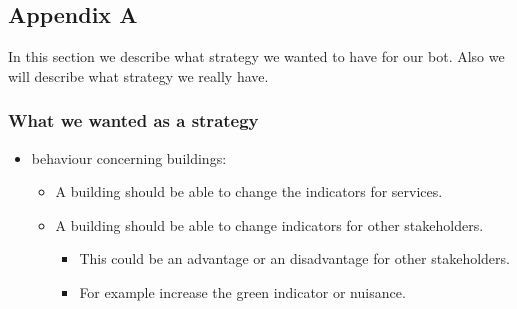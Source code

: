 \subsection{Appendix A}
\label{sec:appendixa}
In this section we describe what strategy we wanted to have for our bot. Also we will describe what strategy we really have.
\subsubsection{What we wanted as a strategy}
\begin{itemize}
	\item behaviour concerning buildings:
	\begin{itemize}
		\item  A building should be able to change the indicators for services.
		\item A building should be able to change indicators for other stakeholders.
		\begin{itemize}
			\item This could be an advantage or an disadvantage for other stakeholders.
			\item For example increase the green indicator or nuisance.
		\end{itemize}
	

\end{itemize}
\end{itemize}
